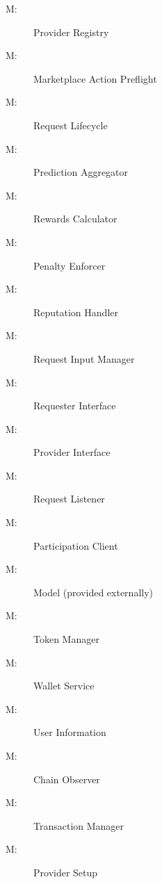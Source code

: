 \documentclass[12pt, titlepage]{article}
\newcounter{mnum}
\newcommand{\mthemnum}{M\themnum}
\begin{document}
\begin{description}

\item [ \mthemnum \label{mRegistry}:] Provider Registry

\item [ \mthemnum \label{mActionPreflight}:] Marketplace Action Preflight

\item [ \mthemnum \label{mLifecycle}:] Request Lifecycle

\item [ \mthemnum \label{mAggregator}:] Prediction Aggregator

\item [ \mthemnum \label{mRewards}:] Rewards Calculator

\item [ \mthemnum \label{mPenalty}:] Penalty Enforcer

\item [ \mthemnum \label{mReputation}:] Reputation Handler

\item [ \mthemnum \label{mInput}:] Request Input Manager

\item [ \mthemnum \label{mRequesterUI}:] Requester Interface

\item [ \mthemnum \label{mProviderUI}:] Provider Interface

\item [ \mthemnum \label{mListener}:] Request Listener

\item [ \mthemnum \label{mParticipation}:] Participation Client

\item [ \mthemnum \label{mModel}:] Model (provided externally)

\item [ \mthemnum \label{mToken}:] Token Manager

\item [ \mthemnum \label{mWallet}:] Wallet Service

\item [ \mthemnum \label{mUserInfo}:] User Information

\item [ \mthemnum \label{mChain}:] Chain Observer

\item [ \mthemnum \label{mTransaction}:] Transaction Manager

\item [ \mthemnum \label{mProviderSetup}:] Provider Setup

\end{description}
\end{document}
